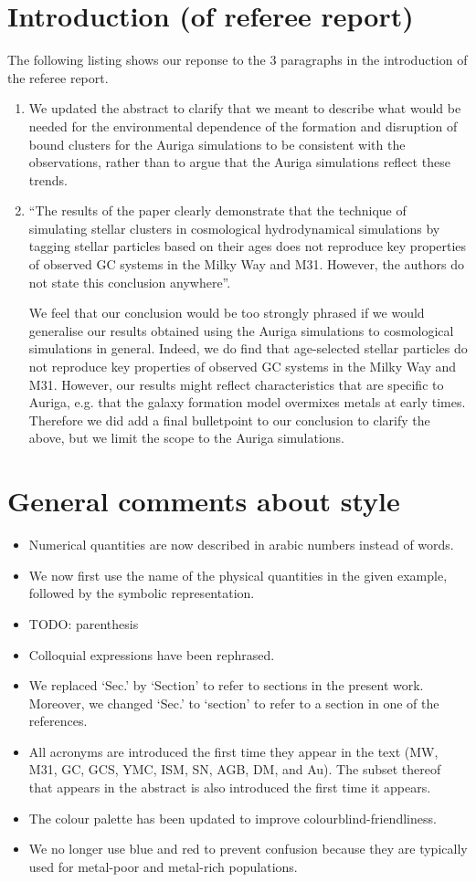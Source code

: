 \documentclass{article}
\begin{document}
\section*{Introduction (of referee report)}
The following listing shows our reponse to the 3 paragraphs in the introduction
of the referee report.
\begin{enumerate}
\item We updated the abstract to clarify that we meant to describe what would
be needed for the environmental dependence of the formation and disruption of
bound clusters for the Auriga simulations to be consistent with the observations,
rather than to argue that the Auriga simulations reflect these trends.
\item
``The results of the paper clearly demonstrate that the technique of simulating
stellar clusters in cosmological hydrodynamical simulations by tagging stellar
particles based on their ages does not reproduce key properties of observed GC 
systems in the Milky Way and M31. However, the authors do not state this conclusion
anywhere''.

We feel that our conclusion would be too strongly phrased if we would generalise 
our results obtained using the Auriga simulations to cosmological simulations 
in general. Indeed, we do find that age-selected stellar particles do not 
reproduce key properties of observed GC systems in the Milky Way and M31. However,
our results might reflect characteristics that are specific to Auriga, 
e.g. that the galaxy formation model overmixes metals at early times. 
Therefore we did add a final bulletpoint to our conclusion to clarify the above, 
but we limit the scope to the Auriga simulations. 
\end{enumerate}

\section*{General comments about style}
\begin{itemize}
\item Numerical quantities are now described in arabic numbers instead of words.
\item We now first use the name of the physical quantities in the given example,
    followed by the symbolic representation.
\item TODO: parenthesis
\item Colloquial expressions have been rephrased.
\item We replaced `Sec.' by `Section' to refer to sections in the present work.
Moreover, we changed `Sec.' to `section' to refer to a section in one of the references.
\item All acronyms are introduced the first time they appear in the text
(MW, M31, GC, GCS, YMC, ISM, SN, AGB, DM, and Au). The subset thereof that appears 
in the abstract is also introduced the first time it appears.
\item The colour palette has been updated to improve colourblind-friendliness.
\item We no longer use blue and red to prevent confusion because they are 
typically used for metal-poor and metal-rich populations.
\end{itemize}
\end{document}
